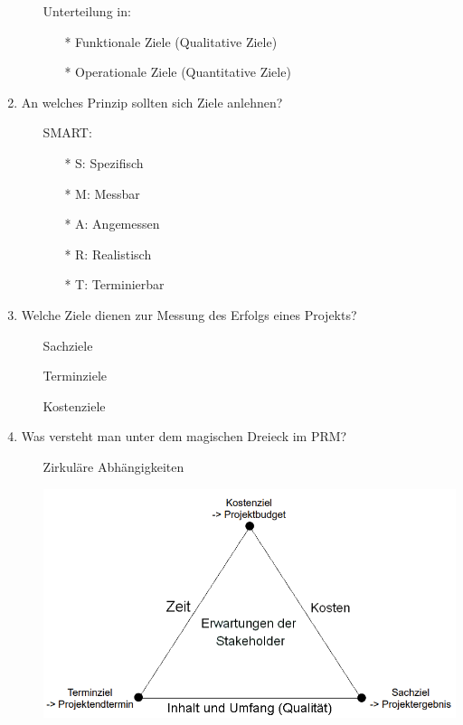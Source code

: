 \documentclass[12pt,a4paper]{article}
\begin{document}
\begin{enumerate}
\begin{enumerate}
		\item[] Unterteilung in: 
			\begin{enumerate}
			\item[*] Funktionale Ziele (Qualitative Ziele)
			\item[*] Operationale Ziele (Quantitative Ziele)
			\end{enumerate}
		\end{enumerate}
	\item An welches Prinzip sollten sich Ziele anlehnen?
		\begin{enumerate}
		\item[] SMART: 
			\begin{enumerate}
			\item[*] S: Spezifisch
			\item[*] M: Messbar
			\item[*] A: Angemessen
			\item[*] R: Realistisch
			\item[*] T: Terminierbar
			\end{enumerate}
		\end{enumerate}
	\item Welche Ziele dienen zur Messung des Erfolgs eines Projekts?
		\begin{enumerate}
		\item[] Sachziele
		\item[] Terminziele
		\item[] Kostenziele
		\end{enumerate}
	\item Was versteht man unter dem magischen Dreieck im PRM?
		\begin{enumerate}
		\item[] Zirkuläre Abhängigkeiten
		\item[] \includegraphics[scale=0.7]{Bilder/magischesDreieck.PNG}

\end{enumerate}
\end{enumerate}
\end{document}
